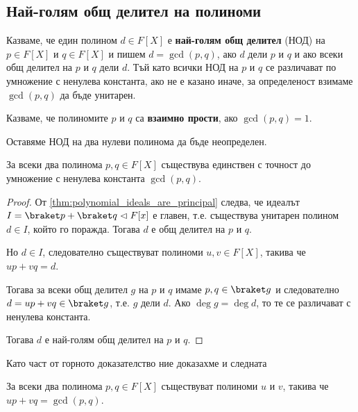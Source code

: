 \documentclass{../../common/topic}
\begin{document}
\subsection{Най-голям общ делител на полиноми}

\begin{definition}
  Казваме, че един полином \( d \in F[X] \) е \textbf{най-голям общ делител} (НОД) на \( p \in F[X] \) и \( q \in F[X] \) и пишем \( d = \gcd(p, q) \), ако \( d \) дели \( p \) и \( q \) и ако всеки общ делител на \( p \) и \( q \) дели \( d \). Тъй като всички НОД на \( p \) и \( q \) се различават по умножение с ненулева константа, ако не е казано иначе, за определеност взимаме \( \gcd(p, q) \) да бъде унитарен.

  Казваме, че полиномите \( p \) и \( q \) са \textbf{взаимно прости}, ако \( \gcd(p, q) = 1 \).

  Оставяме НОД на два нулеви полинома да бъде неопределен.
\end{definition}

\begin{theorem}
  За всеки два полинома \( p, q \in F[X] \) съществува единствен с точност до умножение с ненулева константа \( \gcd(p, q) \).
\end{theorem}
\begin{proof}
  От \cref{thm:polynomial_ideals_are_principal} следва, че идеалът \( I = \braket p + \braket q \vartriangleleft F[x] \) е главен, т.е. съществува унитарен полином \( d \in I \), който го поражда.
  Тогава \( d \) е общ делител на \( p \) и \( q \).

  Но \( d \in I \), следователно съществуват полиноми \( u, v \in F[X] \), такива че \( u p + v q = d \).

  Тогава за всеки общ делител \( g \) на \( p \) и \( q \) имаме \( p, q \in \braket g \) и следователно \( d = u p + v q \in \braket g \), т.е. \( g \) дели \( d \). Ако \( \deg g = \deg d \), то те се различават с ненулева константа.

  Тогава \( d \) е най-голям общ делител на \( p \) и \( q \).
\end{proof}

Като част от горното доказателство ние доказахме и следната
\begin{theorem}
  За всеки два полинома \( p, q \in F[X] \) съществуват полиноми \( u \) и \( v \), такива че \( u p + v q = \gcd(p, q) \).
\end{theorem}
\end{document}
